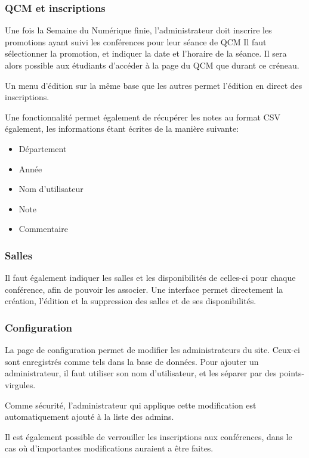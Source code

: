             \subsubsection{QCM et inscriptions}

Une fois la Semaine du Numérique finie, l'administrateur doit inscrire les promotions ayant suivi les conférences pour leur
séance de QCM Il faut sélectionner la promotion, et indiquer la date et l'horaire de la séance. Il sera alors possible aux étudiants d'accéder à la page du QCM que durant ce créneau.

Un menu d'édition sur la même base que les autres permet l'édition en direct des inscriptions.

Une fonctionnalité permet également de récupérer les notes au format CSV également, les informations étant écrites de la manière suivante:

    \begin{itemize}
    \item Département
    \item Année
    \item Nom d'utilisateur
    \item Note
    \item Commentaire
    \end{itemize}

            \subsubsection{Salles}

Il faut également indiquer les salles et les disponibilités de celles-ci pour chaque conférence, afin de pouvoir les associer.
Une interface permet directement la création, l'édition et la suppression des salles et de ses disponibilités.

            \subsubsection{Configuration}

La page de configuration permet de modifier les administrateurs du site. Ceux-ci sont enregistrés comme tels dans la base de données.
Pour ajouter un administrateur, il faut utiliser son nom d'utilisateur, et les séparer par des points-virgules.

Comme sécurité, l'administrateur qui applique cette modification est automatiquement ajouté à la liste des admins.

Il est également possible de verrouiller les inscriptions aux conférences, dans le cas où d'importantes modifications
auraient a être faites.

